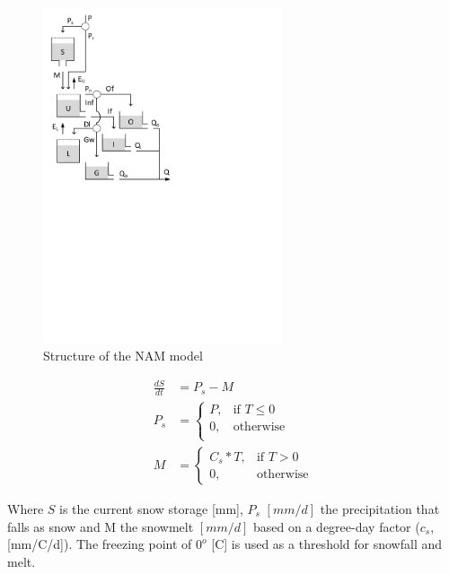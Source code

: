 { 																	%
\begin{figure}
\includegraphics[trim=1cm 14cm 7cm 1cm,width=7cm,keepaspectratio]{./AppA_files/41_schematic.pdf}
\caption{Structure of the NAM model} \label{fig:41_schematic}
\end{figure}

\begin{align}
	\frac{dS}{dt} &= P_s-M \\
	P_s &= \begin{cases}
		P, &\text{if } T \leq 0 \\
		0, & \text{otherwise} \\
	\end{cases} \\
	M &= 
	\begin{cases}
		C_s*T, & \text{if } T > 0 \\
		0, & \text{otherwise}
	\end{cases}
\end{align}

Where $S$ is the current snow storage [mm], $P_s$ $[mm/d]$ the precipitation that falls as snow and M the snowmelt $[mm/d]$ based on a degree-day factor ($c_s$, [mm/\degree C/d]). The freezing point of $0^o$ [C] is used as a threshold for snowfall and melt.

} %

